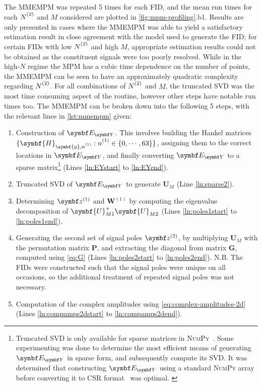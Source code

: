 The \ac{MMEMPM} was repeated 5 times for each \ac{FID}, and the mean run
times for each $\Ntwo$ and $M$ considered are plotted in
\cref{fig:mpm-profiling}.b1.
Results are only presented in cases where the \ac{MMEMPM} was able to yield a
satisfactory estimation result in close agreement with the model used to
generate the \ac{FID}; for certain \acp{FID} with low
$\Ntwo$ and high $M$, appropriate estimation results could not be obtained as
the constituent signals were too poorly resolved.
While in the high-$N$ regime the \ac{MPM} has a cubic time dependence
on the number of points, the \ac{MMEMPM} can be seen to have an approximately
quadratic complexity regarding $\Ntwo$.
For all combinations of $\Ntwo$ and $M$,
the truncated \ac{SVD} was the most time consuming aspect of the routine,
however other steps have notable run times too. The \ac{MMEMPM} can be broken
down into the following 5 steps, with the relevant lines in \cref{lst:mmempm}
given:
\begin{enumerate}
    \item Construction of $\EY$. This involves building the Hankel matrices
        $\lbrace \symbf{H}_{\symbf{y},\none} : \none \in \lbrace 0, \cdots, 63
        \rbrace \rbrace$, assigning them to the
        correct locations in $\EY$, and finally converting  $\EY$ to a sparse
        matrix\footnote{
            Truncated \ac{SVD} is only available for sparse matrices in
            \textsc{NumPy}~\cite{svds}. Some experimenting was done to determine
            the most efficient means of generating $\EY$ in sparse form, and
            subsequently compute its \ac{SVD}.
            It was determined that constructing $\EY$ using a
            standard \textsc{NumPy} array before converting it to
            \ac{CSR} format~\cite{csr} was optimal.
            \label{fn:sparse-svd}
        } (Lines \ref{ln:EYstart} to \ref{ln:EYend}).
    \item Truncated \ac{SVD} of $\EY$ to generate $\symbf{U}_M$ (Line \ref{ln:sparse2}).
    \item Determining $\bdzone$ and  $\symbf{W}^{(1)}$ by computing the
        eigenvalue decomposition of $\symbf{U}_{M1}^+ \symbf{U}_{M2}^{\vphantom{+}}$ (Lines
        \ref{ln:poles1start} to \ref{ln:poles1end}).
    \item Generating the second set of signal poles $\bdztwo$, by
        multiplying $\symbf{U}_M$ with the permutation matrix $\symbf{P}$, and
        extracting the diagonal from matrix $\symbf{G}$, computed using
        \cref{eq:G} (Lines \ref{ln:poles2start} to \ref{ln:poles2end}). N.B.
        The \acp{FID} were constructed such that the signal poles were unique
        on all occasions, so the additional treatment of repeated signal poles
        was not necessary.
    \item Computation of the complex amplitudes using
        \cref{eq:complex-amplitudes-2d} (Lines \ref{ln:compamps2dstart} to
        \ref{ln:compamps2dend}).
\end{enumerate}
